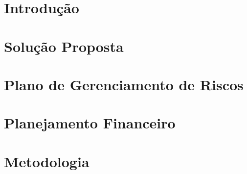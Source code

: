 % 



\chapter{Introdução} %


\chapter{Solução Proposta} %

\label{cha:solucao}


\chapter{Plano de Gerenciamento de Riscos}

\label{cha:riscos}

\chapter{Planejamento Financeiro}


\chapter{Metodologia}

\label{cha:metodologia}
